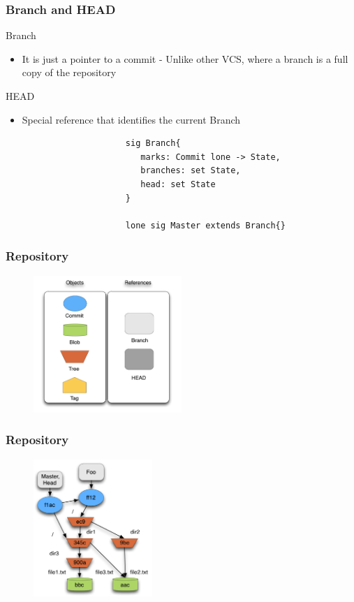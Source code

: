 \documentclass{beamer}
\begin{document}
\begin{frame}[fragile]
\frametitle{Branch and HEAD}
   \begin{block}{Branch}
      \begin{itemize}
         \item It is just a pointer to a commit - Unlike other VCS, where a branch is a full copy of the repository
      \end{itemize}
   \end{block}
   \begin{block}{HEAD}
      \begin{itemize} 
         \item Special reference that identifies the current Branch
      \end{itemize}
   \end{block}
   \tiny
   \color{blue}
   \begin{lstlisting}
                        sig Branch{
                           marks: Commit lone -> State,
                           branches: set State,
                           head: set State
                        }

                        lone sig Master extends Branch{}
   \end{lstlisting}
\end{frame}
\begin{frame}

\frametitle{Repository}
   \begin{figure}
      \centering
      \includegraphics[width=0.5\textwidth]{images/legenda2.png}
   \end{figure}
\end{frame}

\begin{frame}
	\frametitle{Repository}
	\begin{figure}
		\centering
		\includegraphics[width=0.4\textwidth]{images/object_assoc.png}
	\end{figure}
\end{frame}
\end{document}

